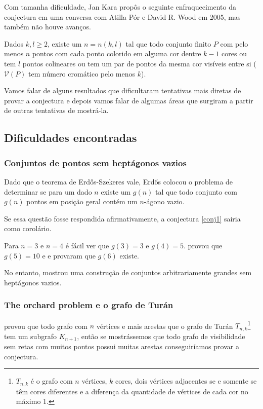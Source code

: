 Com tamanha dificuldade, Jan Kara propôs o seguinte enfraquecimento da conjectura em uma conversa com Atilla Pór e David R. Wood em 2005, mas também não houve avanços.
\begin{conjectura}
    Dados $k,l\geq 2$, existe um $n=n(k,l)$ tal que todo conjunto finito $P$ com pelo menos $n$ pontos com cada ponto colorido em alguma cor dentre $k-1$ cores ou tem $l$ pontos colineares ou tem um par de pontos da mesma cor visíveis entre si ($\mathcal V(P)$ tem número cromático pelo menos $k$).
\end{conjectura}

Vamos falar de alguns resultados que dificultaram tentativas mais diretas de provar a conjectura e depois vamos falar de algumas áreas que surgiram a partir de outras tentativas de mostrá-la.
\subsection{Dificuldades encontradas}

\subsubsection{Conjuntos de pontos sem heptágonos vazios}
Dado que o teorema de Erd\H os-Szekeres vale, Erd\H os colocou o problema de determinar se para um dado $n$ existe um $g(n)$ tal que todo conjunto com $g(n)$ pontos em posição geral contém um $n$-ágono vazio.

Se essa questão fosse respondida afirmativamente, a conjectura \ref{conj1} sairia como corolário.

Para $n=3$ e $n=4$ é fácil ver que $g(3)=3$ e $g(4)=5$. \cite{Harborth1978} provou que $g(5)=10$ e \cite{Gerken} e \cite{Nicolas} provaram que $g(6)$ existe.

No entanto, \cite{heptagon} mostrou uma construção de conjuntos arbitrariamente grandes sem heptágonos vazios.

\subsubsection{The orchard problem e o grafo de Turán}
\cite{Turan} provou que todo grafo com $n$ vértices e mais arestas que o grafo de Turán $T_{n,k}$\footnote{$T_{n,k}$ é o grafo com $n$ vértices, $k$ cores, dois vértices adjacentes se e somente se têm cores diferentes e a diferença da quantidade de vértices de cada cor no máximo $1$.} tem um subgrafo $K_{n+1}$, então se mostrássemos que todo grafo de visibilidade sem retas com muitos pontos possui muitas arestas conseguiríamos provar a conjectura.

